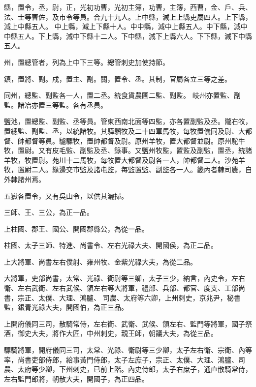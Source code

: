 \begin{pinyinscope}
 縣，置令，丞，尉，正，光初功曹，光初主簿，功曹，主簿，西曹，金、戶、兵、法、士等曹佐，及市令等員。合九十九人。上中縣，減上上縣吏屬四人。上下縣，減上中縣五人。
 中上縣，減上下縣十人。中中縣，減中上縣五人。中下縣，減中中縣五人。下上縣，減中下縣十二人。下中縣，減下上縣六人。下下縣，減下中縣五人。



 州，置總管者，列為上中下三等。總管刺史加使持節。



 鎮，置將、副。戍，置主、副。關，置令、丞。其制，官屬各立三等之差。



 同州，總監、副監各一人，置二丞。統食貨農圃二監、副監。
 岐州亦置監、副監。諸冶亦置三等監。各有丞員。



 鹽池，置總監、副監、丞等員。管東西南北面等四監，亦各置副監及丞。隴右牧，置總監、副監、丞，以統諸牧。其驊騮牧及二十四軍馬牧，每牧置儀同及尉、大都督、帥都督等員。驢騾牧，置帥都督及尉。原州羊牧，置大都督並尉。原州駝牛牧，置尉。又有皮毛監、副監及丞、錄事。又鹽州牧監，置監及副監，置丞，統諸羊牧，牧置尉。苑川十二馬牧，每牧置大都督及尉各一人，帥都督二人。沙苑羊牧，置尉二人。緣邊交市監及諸屯監，每監置監、副監各一人。畿內者隸司農，自外隸諸州焉。



 五嶽各置令，又有吳山令，以供其灑掃。



 三師、王、三公，為正一品。



 上柱國、郡王、國公、開國郡縣公，為從一品。



 柱國、太子三師、特進、尚書令、左右光祿大夫、開國侯，為正二品。



 上大將軍、尚書左右僕射、雍州牧、金紫光祿大夫，為從二品。



 大將軍，吏部尚書，太常、光祿、衛尉等三卿，太子三少，納言，內史令，左右衛、左右武衛、左右武候、領左右等大將軍，禮部、兵部、都官、度支、工部尚書，宗正、太僕、大理、鴻臚、
 司農、太府等六卿，上州刺史，京兆尹，秘書監，銀青光祿大夫，開國伯，為正三品。



 上開府儀同三司，散騎常侍，左右衛、武衛、武候、領左右、監門等將軍，國子祭酒，御史大夫，將作大匠，中州刺史，親王師，朝議大夫，為從三品。



 驃騎將軍，開府儀同三司，太常、光祿、衛尉等三少卿，太子左右衛、宗衛、內等率，尚書吏部侍郎，給事黃門侍郎，太子左庶子，宗正、太僕、大理、鴻臚、司農、太府等少卿，下州刺史，已前上階。內史侍郎，太子右庶子，通直散騎常侍，左右監門郎將，朝散大夫，開國子，為正四品。




\end{pinyinscope}
